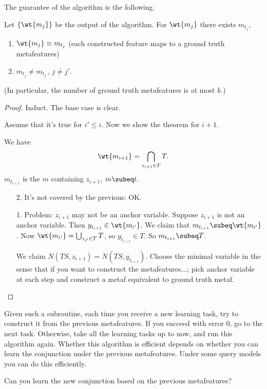 The guarantee of the algorithm is the following.
\begin{lem}
Let $\{\wt{m_j}\}$ be the output of the algorithm.
For $\wt{m_j}$ there exists $m_{t_j}$, 
\begin{enumerate}
\item
$\wt{m_j}\equiv m_{t_j}$ (each constructed feature maps to a ground truth metafeatures)
\item
$m_{t_j}\ne m_{t_{j'}}$, $j\ne j'$.
\end{enumerate}
(In particular, the number of ground truth metafeatures is at most $k$.)
\end{lem}
\begin{proof}
Induct. The base case is clear.

Assume that it's true for $i'\le i$. Now we show the theorem for $i+1$.

We have 
\[
\wt{m_{i+1}}=\bigcap_{z_{i+1}\in T} T.
\]
$m_{t_{i+1}}$ is the $m$ containing $z_{i+1}$, $m\subeq t$.
\begin{enumerate}
\item[2.]
It's not covered by the previous: OK.
\item[1.]
Problem: $z_{i+1}$ may not be an anchor variable.
Suppose $z_{i+1}$ is not an anchor variable. Then $y_{t_{i+1}}\in \wt{m_{i'}}$. We claim that $m_{t_{i+1}}\subeq \wt{m_{i'}}$.
%
Now $\wt{m_{i'}}=\bigcup_{z_{i'}\in T}T$, so $y_{t_{i+1}}\in T$. %
So $m_{t_{i+1}}\subeq T$.


We claim $N(TS,z_{i+1})=N(TS,y_{t_{i+1}})$. Choose the minimal variable in the sense that if you want to construct the metafeatures...; pick anchor variable at each step and construct a metaf equivalent to ground truth metaf.
%
\end{enumerate}
\end{proof}

Given such a subroutine, each time you receive a new learning task, try to construct it from the previous metafeatures. If you succeed with error 0, go to the next task. Otherwise, take all the learning tasks up to now, and run this algorithm again. Whether this algorithm is efficient depends on whether you can learn the conjunction under the previous metafeatures. Under some query models you can do this efficiently.

Can you learn the new conjunction based on the previous metafeatures? %

